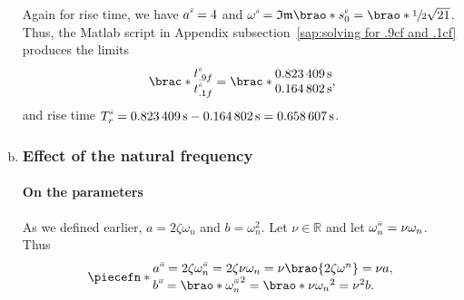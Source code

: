 \documentclass[12pt]{article}
\DeclarePairedDelimiter\brao()%
\DeclarePairedDelimiter\brac[]%
\DeclarePairedDelimiter\piecefn\{.
\newcommand{\setprime}[2][1]{%
    {#2}^{%
        \raisebox{1pt}{%
            \scalebox{0.5}{%
                \itshape\sffamily\uppercase%
                \expandafter{%
                    \romannumeral#1%
                }%
            }%
        }
    }%
}%
\begin{document}
\begin{enumerate}[(a)]
        Again for rise time, we have $\setprime[2]a = 4$ and $\setprime[2]\omega = \mathfrak{Im}\brao*{\setprime[2]s_0} = \brao*{\sfrac12}\sqrt{21}$.
        Thus, the Matlab script in Appendix subsection~\ref{sap:solving for .9cf and .1cf} produces the limits
        \begin{equation}
            \brac*{
                \begin{matrix}
                    \setprime[2]t_{.9f} \\*
                    \setprime[2]t_{.1f} \\*
                \end{matrix}
            }
            =
            \brac*{
                \begin{matrix}
                    \SI{0.823409}\second \\*
                    \SI{0.164802}\second \\*
                \end{matrix}
            }\rlap,
        \end{equation}
        and rise time $\setprime[2]T_r = \SI{0.823409}\second - \SI{0.164802}\second = \SI{0.658607}\second$.

    \item
        \subsubsection{Effect of the natural frequency}

        \paragraph{On the parameters}
        As we defined earlier, $a = 2\zeta\omega_n$ and $b = \omega_n^2$.
        Let $\nu \in \mathbb{R}$ and let $\setprime[3]\omega_n = \nu\omega_n$.
        Thus
        \begin{equation}
            \piecefn*{
                \begin{array}{@{}l@{}}
                    \setprime[3]a = 2\zeta\setprime[3]\omega_n = 2\zeta\nu\omega_n = \nu\brao{2\zeta\omega^n} = \nu a,
                \\*
                    \setprime[3]b = \brao*{\setprime[3]\omega_n}^2 = \brao*{\nu\omega_n}^2 = \nu^2 b.
                \\*
                \end{array}
            }
        \end{equation}


\end{enumerate}
\end{document}
